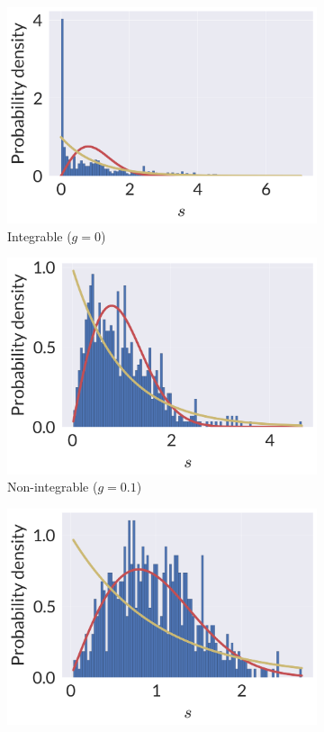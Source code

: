 \begin{figure}
\centering
\begin{subfigure}[t]{0.33\textwidth}
\includegraphics[width=\linewidth]{figures/chapter1/LevelRepulsion0.png}
\caption{Integrable ($g=0$)}
\end{subfigure}%
\begin{subfigure}[t]{0.33\textwidth}
\includegraphics[width=\linewidth]{figures/chapter1/LevelRepulsion01.png}
\caption{Non-integrable ($g=0.1$)}
\end{subfigure}%
\begin{subfigure}[t]{0.33\textwidth}
\includegraphics[width=\linewidth]{figures/chapter1/LevelRepulsion05.png}

\end{subfigure}
\end{figure}

